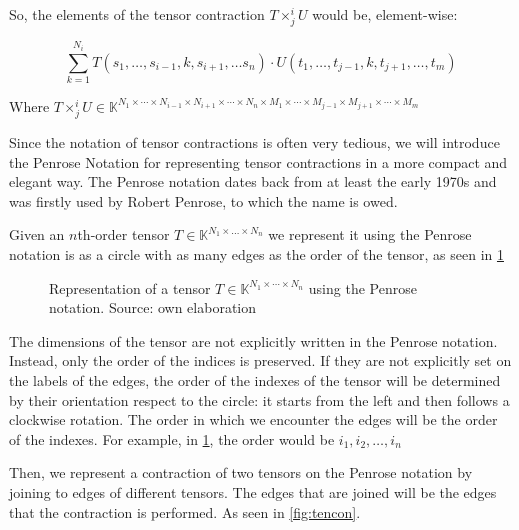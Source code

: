 \documentclass[11pt,a4paper,openright,oneside]{book}
\numberwithin{equation}{section}
\newcommand{\figref}[1]{\cref{#1}}
\begin{document}
So, the elements of the tensor contraction $T \times^i_j U$ would be, element-wise:

$$\sum_{k = 1}^{N_i} T(s_1, \dots, s_{i-1}, k, s_{i+1}, \dots s_n) \cdot U(t_1, \dots, t_{j-1}, k, t_{j+1}, \dots, t_m) $$

Where $T \times^i_j U \in \mathbb{K}^{N_1 \times \cdots \times N_{i-1} \times N_{i+1} \times \cdots \times N_n \times M_1 \times \cdots \times 
M_{j-1} \times M_{j+1} \times \cdots \times M_m}$

Since the notation of tensor contractions is often very tedious, we will introduce the Penrose Notation for representing tensor contractions in a
more compact and elegant way. The Penrose notation dates back from at least the early 1970s and was
firstly used by Robert Penrose, to which the name is owed. \cite{rogerPenroseApplications}

Given an $n$th-order tensor $T \in \mathbb{K}^{N_1 \times \dots \times N_n}$ we represent it using the
Penrose notation is as a circle with as many edges as the order of the tensor, as seen in \figref{fig:tens}

\begin{figure}[h]
\centering
{}
\caption{
    Representation of a tensor $T \in \mathbb{K}^{N_1 \times \cdots \times N_n}$ using the Penrose notation. Source: own elaboration
}
\label{fig:tens}
\end{figure}

The dimensions of the tensor are not explicitly written in the Penrose notation. Instead, only the order
of the indices is preserved. If they are not explicitly set on the labels of the edges,
the order of the indexes of the tensor will be determined by their orientation respect to the circle: 
it starts from the left and then follows a clockwise rotation. The order in which we encounter the edges will be the order of the indexes. 
For example, in \figref{fig:tens}, the order would be $i_1, i_2, \dots, i_n$

Then, we represent a contraction of two tensors on the Penrose notation by joining to edges of different tensors. The edges that are
joined will be the edges that the contraction is performed. As seen in \figref{fig:tencon}.
\end{document}
